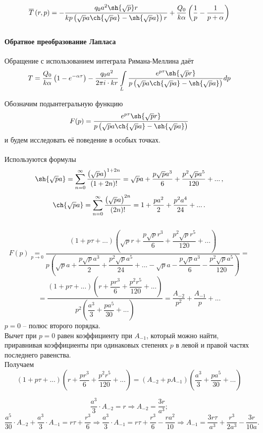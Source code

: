 \documentclass[a4paper, 11pt]{article}
\newenvironment{solution}
    {\textit{}}
    {}
\begin{document}
\begin{solution}
	
	$$\overline{T}\left(r,p\right)=-\frac{q_0a^2\sh{\sqrt{p}}r}{kp\left(\sqrt{p}a\ch{\sqrt{p}a}-\sh{\sqrt{p}a}\right)r}+\frac{Q_0}{k\alpha}\left(\frac{1}{p}-\frac{1}{p+\alpha}\right)$$\\
\textbf{Обратное преобразование Лапласа}\\\\
	Обращение с использованием интеграла Римана-Меллина даёт $$T=\frac{Q_0}{k\alpha}\left(1-e^{-\alpha\tau}\right)-\frac{q_0a^2}{2\pi i\cdot kr}\int\limits_{L}\frac{e^{p\tau}\sh{\sqrt{p}r}}{p\left(\sqrt{p}a\ch{\sqrt{p}a}-\sh{\sqrt{p}a}\right)}dp$$
	
	Обозначим подынтегральную функцию $$F(p)=\frac{e^{p\tau}\sh{\sqrt{p}r}}{p\left(\sqrt{p}a\ch{\sqrt{p}a}-\sh{\sqrt{p}a}\right)}$$ и будем исследовать её поведение в особых точках.\\\\
	Используются формулы $$\sh{\sqrt{p}a}=\sum_{n=0}^{\infty}\frac{\left(\sqrt{p}a\right)^{1+2n}}{\left(1+2n\right)!}=\sqrt{p}a+\frac{p\sqrt{p}a^3}{6}+\frac{p^2\sqrt{p}a^5}{120}+...\,,$$
	$$\ch{\sqrt{p}a}=\sum_{n=0}^{\infty}\frac{\left(\sqrt{p}a\right)^{2n}}{\left(2n\right)!}=1+\frac{pa^2}{2}+\frac{p^2a^4}{24}+...\,.$$\\
	$$F(p)\underset{p\to0}{=}\frac{\left(1+p\tau+...\right)\left(\sqrt{p}r+\dfrac{p\sqrt{p}r^3}{6}+\dfrac{p^2\sqrt{p}r^5}{120}+...\right)}{p\left(\sqrt{p}a+\dfrac{p\sqrt{p}a^3}{2}+\dfrac{p^2\sqrt{p}a^5}{24}+...-\sqrt{p}a-\dfrac{p\sqrt{p}a^3}{6}-\dfrac{p^2\sqrt{p}a^5}{120}\right)}=$$$$=\frac{\left(1+p\tau+...\right)\left(r+\dfrac{pr^3}{6}+\dfrac{p^2r^5}{120}+...\right)}{p^2\left(\dfrac{a^3}{3}+\dfrac{pa^5}{30}+...\right)}=\frac{A_{-2}}{p^2}+\frac{A_{-1}}{p}+...$$
	$p=0$ -- полюс второго порядка.\\
	Вычет при $p=0$ равен коэффициенту при $A_{-1}$, который можно найти, приравнивая коэффициенты при одинаковых степенях $p$ в левой и правой частях последнего равенства.\\
	Получаем
	$$\left(1+p\tau+...\right)\left(r+\dfrac{pr^3}{6}+\dfrac{p^2r^5}{120}+...\right)=\left(A_{-2}+pA_{-1}\right)\left(\frac{a^3}{3}+\frac{pa^5}{30}+...\right)$$
	
	$$\frac{a^3}{3}\cdot A_{-2}=r\Rightarrow A_{-2}=\frac{3r}{a^3};$$
	$$\frac{a^5}{30}\cdot A_{-2}+\frac{a^3}{3}\cdot A_{-1}=r\tau+\frac{r^3}{6}\Rightarrow \frac{a^3}{3}\cdot A_{-1}=r\tau+\frac{r^3}{6}-\frac{ra^2}{10}\Rightarrow A_{-1}=\frac{3r\tau}{a^3}+\frac{r^3}{2a^3}-\frac{3r}{10a}.$$\\
	

\end{solution}
\end{document}
